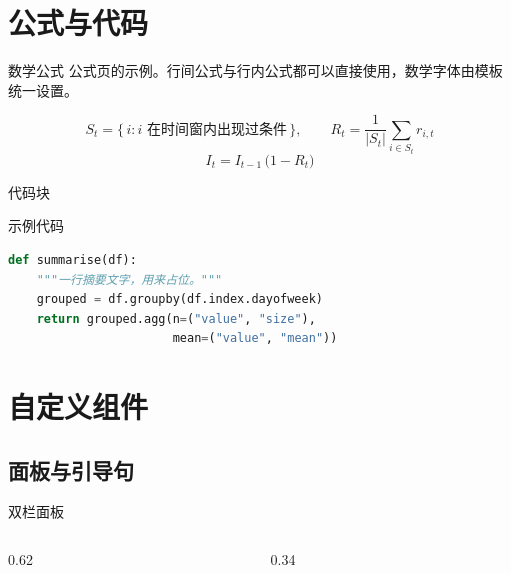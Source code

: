\documentclass{beamer}
\begin{document}
\section{公式与代码}

\begin{frame}{数学公式}
    公式页的示例。行间公式与行内公式都可以直接使用，数学字体由模板统一设置。

    \vspace{0.3cm}
    \[
        S_t = \{\, i : i \text{ 在时间窗内出现过条件}\,\},
        \qquad
        R_t = \frac{1}{|S_t|}\sum_{i \in S_t} r_{i,t}
    \]
    \[
        I_t = I_{t-1}\,\bigl(1 - R_t\bigr)
    \]

    \vspace{0.3cm}
\end{frame}

\begin{frame}[fragile]{代码块}
\begin{codepanel}{示例代码}
\begin{lstlisting}[language=Python]
def summarise(df):
    """一行摘要文字，用来占位。"""
    grouped = df.groupby(df.index.dayofweek)
    return grouped.agg(n=("value", "size"),
                       mean=("value", "mean"))
\end{lstlisting}
\end{codepanel}
\end{frame}

\section{自定义组件}

\subsection{面板与引导句}

\begin{frame}{双栏面板}
    \begin{columns}[T,onlytextwidth]
        \begin{column}{0.62\textwidth}
        \end{column}
        \begin{column}{0.34\textwidth}
        \end{column}
    \end{columns}
\end{frame}
\end{document}
